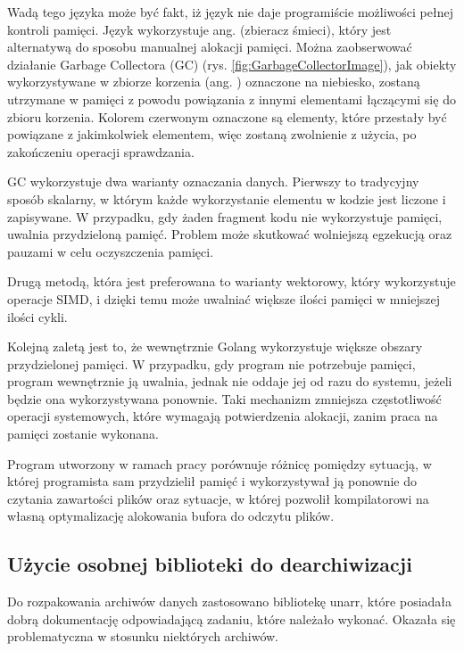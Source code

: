 Wadą tego języka może być fakt, iż język nie daje programiście możliwości pełnej
kontroli pamięci. Język wykorzystuje ang.  (zbieracz 
śmieci), który jest alternatywą do sposobu manualnej alokacji pamięci. Można 
zaobserwować działanie Garbage Collectora (GC) (rys. \ref{fig:GarbageCollectorImage}),
jak obiekty wykorzystywane w zbiorze korzenia (ang. ) oznaczone na 
niebiesko, zostaną utrzymane w pamięci z powodu powiązania z innymi elementami
łączącymi się do zbioru korzenia. Kolorem czerwonym oznaczone są elementy, które
przestały być powiązane z jakimkolwiek elementem, więc zostaną zwolnienie z 
użycia, po zakończeniu operacji sprawdzania. 

GC wykorzystuje dwa warianty oznaczania danych. Pierwszy to tradycyjny sposób
skalarny, w którym każde wykorzystanie elementu w kodzie jest liczone i
zapisywane. W przypadku, gdy żaden fragment kodu nie wykorzystuje pamięci,
 uwalnia przydzieloną pamięć. Problem może skutkować
 wolniejszą egzekucją oraz pauzami w celu oczyszczenia pamięci.

Drugą metodą, która jest preferowana to warianty wektorowy, który wykorzystuje 
operacje SIMD, i dzięki temu może uwalniać większe ilości pamięci w mniejszej
ilości cykli. 

Kolejną zaletą jest to, że wewnętrznie Golang wykorzystuje większe obszary
przydzielonej pamięci. W przypadku, gdy program nie potrzebuje pamięci, program
wewnętrznie ją uwalnia, jednak nie oddaje jej od razu do systemu, jeżeli będzie 
ona wykorzystywana ponownie. Taki mechanizm zmniejsza częstotliwość operacji
systemowych, które wymagają potwierdzenia alokacji, zanim praca na pamięci 
zostanie wykonana. 

Program utworzony w ramach pracy porównuje różnicę pomiędzy sytuacją, w której
programista sam przydzielił pamięć i wykorzystywał ją ponownie do czytania 
zawartości plików oraz sytuacje, w której pozwolił kompilatorowi na własną
optymalizację alokowania bufora do odczytu plików.

\subsection{Użycie osobnej biblioteki do dearchiwizacji}

Do rozpakowania archiwów danych zastosowano bibliotekę unarr, które posiadała
dobrą dokumentację odpowiadającą zadaniu, które należało wykonać. Okazała się
problematyczna w stosunku niektórych archiwów.

